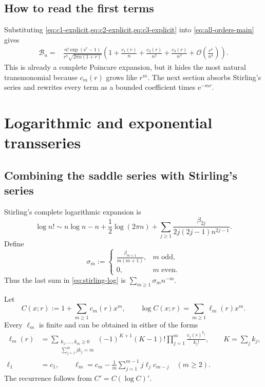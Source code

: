 \documentclass[11pt,a4paper]{article}
\theoremstyle{definition}
\theoremstyle{remark}
\newcommand{\Bell}{\mathcal B}
\newcommand{\ee}{\mathrm e}
\newcommand{\BigO}{\mathcal O}
\newcommand{\Bern}{\beta}
\begin{document}
\subsection{How to read the first terms}

Substituting \cref{eq:c1-explicit,eq:c2-explicit,eq:c3-explicit} into
\cref{eq:all-orders-main} gives
\begin{align}\label{eq:bell-first-cs}
 \Bell_n={}&
 \frac{n!\exp(\ee^r-1)}{r^n\sqrt{2\pi n(1+r)}}
 \left(
  1+\frac{c_1(r)}n+\frac{c_2(r)}{n^2}
    +\frac{c_3(r)}{n^3}
    +\BigO\!\left(\frac{r^4}{n^4}\right)
 \right).
\end{align}
This is already a complete Poincare expansion, but it hides the most natural
transmonomial because \(c_m(r)\) grows like \(r^m\).  The next section absorbs
Stirling's series and rewrites every term as a bounded coefficient times
\(\ee^{-mr}\).

\section{Logarithmic and exponential transseries}\label{sec:logtrans}

\subsection{Combining the saddle series with Stirling's series}

Stirling's complete logarithmic expansion is
\begin{equation}\label{eq:stirling-log}
 \log n!
 \sim n\log n-n+\frac12\log(2\pi n)
 +\sum_{j\ge1}\frac{\Bern_{2j}}{2j(2j-1)n^{2j-1}}.
\end{equation}
Define
\begin{equation}\label{eq:sigma-m}
 \sigma_m:=
 \begin{cases}
 \displaystyle\frac{\Bern_{m+1}}{m(m+1)},&m\text{ odd},\\[2mm]
 0,&m\text{ even}.
 \end{cases}
\end{equation}
Thus the last sum in \cref{eq:stirling-log} is
\(\sum_{m\ge1}\sigma_mn^{-m}\).

Let
\begin{equation}\label{eq:ell-def}
 C(x;r):=1+\sum_{m\ge1}c_m(r)x^m,
 \qquad
 \log C(x;r)=\sum_{m\ge1}\ell_m(r)x^m.
\end{equation}
Every \(\ell_m\) is finite and can be obtained in either of the forms
\begin{align}
 \ell_m(r)
 &=\sum_{\substack{k_1,\ldots,k_m\ge0\\
                    \sum_{j=1}^mjk_j=m}}
   (-1)^{K+1}(K-1)!
   \prod_{j=1}^m\frac{c_j(r)^{k_j}}{k_j!},
 \qquad K=\sum_jk_j,
 \label{eq:ell-partition}\\
 \ell_1&=c_1,
 \qquad
 \ell_m=c_m-\frac1m\sum_{j=1}^{m-1}j\ell_jc_{m-j}
 \quad(m\ge2).
 \label{eq:ell-recurrence}
\end{align}
The recurrence follows from \(C'=C(\log C)'\).
\end{document}
